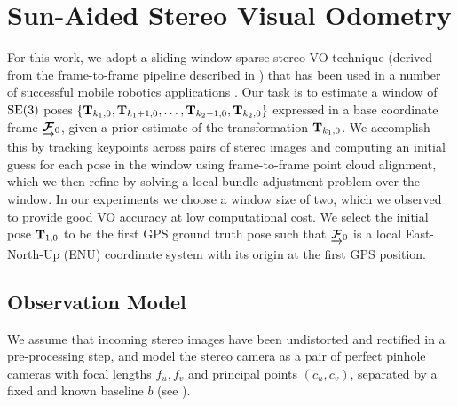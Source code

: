 \section{Sun-Aided Stereo Visual Odometry} 
\label{sec:sun_bcnn-stereo-vo}
For this work, we adopt a sliding window sparse stereo VO technique (derived from the frame-to-frame pipeline described in ) that has been used in a number of successful mobile robotics applications \citep{Cheng2006-nl,Furgale2010-to,Geiger2011-xe,Kelly2008-mh}.
Our task is to estimate a window of $\mathrm{SE}(3)$ poses $\left\{\boldsymbol{\mathbf{T}}_{k_1,0}, \boldsymbol{\mathbf{T}}_{k_1+1,0}, \dots, \boldsymbol{\mathbf{T}}_{k_2-1, 0}, \boldsymbol{\mathbf{T}}_{k_2, 0}\right\}$ expressed in a base coordinate frame $\underrightarrow{ \boldsymbol{\mathbf{\mathcal{F}}} }_{0}$, given a prior estimate of the transformation $\boldsymbol{\mathbf{T}}_{k_1,0}$.
We accomplish this by tracking keypoints across pairs of stereo images and computing an initial guess for each pose in the window using frame-to-frame point cloud alignment, which we then refine by solving a local bundle adjustment problem over the window.
In our experiments we choose a window size of two, which we observed to provide good VO accuracy at low computational cost. 
We select the initial pose $\boldsymbol{\mathbf{T}}_{1,0}$ to be the first GPS ground truth pose such that $\underrightarrow{ \boldsymbol{\mathbf{\mathcal{F}}} }_{0}$ is a local East-North-Up (ENU) coordinate system with its origin at the first GPS position.

\subsection{Observation Model}
We assume that incoming stereo images have been undistorted and rectified in a pre-processing step, and model the stereo camera as a pair of perfect pinhole cameras with focal lengths $f_u, f_v$ and principal points $\left(c_u,c_v\right)$, separated by a fixed and known baseline $b$ (see ).

